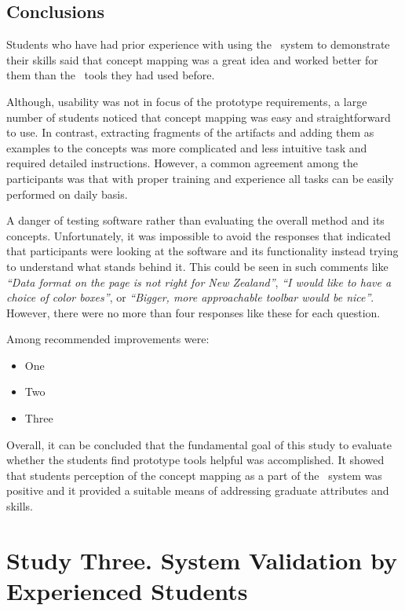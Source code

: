 \subsection{Conclusions}

Students who have had prior experience with using the \ep~system to demonstrate
their \LLLs skills said that concept mapping was a great idea and worked better
for them than the \ep~tools they had used before.

Although, usability was not in focus of the prototype requirements, a large
number of students noticed that concept mapping was easy and straightforward to
use. In contrast, extracting fragments of the artifacts and adding them as
examples to the concepts was more complicated and less intuitive task and
required detailed instructions. However, a common agreement among the
participants was that with proper training and experience all tasks can be
easily performed on daily basis.

A danger of testing software rather than evaluating the overall method and its
concepts. Unfortunately, it was impossible to avoid the responses that indicated
that participants were looking at the software and its functionality instead
trying to understand what stands behind it. This could be seen in such comments
like \textit{``Data format on the page is not right for New Zealand''},
\textit{``I would like to have a choice of color boxes''}, or \textit{``Bigger,
more approachable toolbar would be nice''}. However, there were no more than
four responses like these for each question.

Among recommended improvements were:

\begin{itemize}
  \item One
  \item Two
  \item Three
\end{itemize}
 
Overall, it can be concluded that the fundamental goal of this study to
evaluate whether the students find prototype tools helpful was accomplished. It
showed that students perception of the concept mapping as a part of the
\ep~system was positive and it provided a suitable means of addressing graduate
attributes and \LLLs skills.

\section{Study Three. System Validation by Experienced Students}
\label{sec:three}

